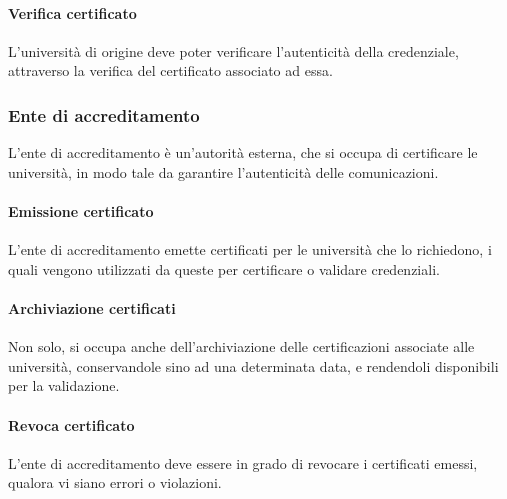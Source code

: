 \documentclass[a4paper,12pt]{article}
\begin{document}
\paragraph{Verifica certificato} L'università di origine deve poter verificare l'autenticità della credenziale, attraverso la verifica del certificato associato ad essa.

\subsubsection{Ente di accreditamento}
L'ente di accreditamento è un'autorità esterna, che si occupa di certificare le università, in modo tale da garantire l'autenticità delle comunicazioni. 
\paragraph{Emissione certificato} L'ente di accreditamento emette certificati per le università che lo richiedono, i quali vengono utilizzati da queste per certificare o validare credenziali.
\paragraph{Archiviazione certificati} Non solo, si occupa anche dell'archiviazione delle certificazioni associate alle università, conservandole sino ad una determinata data, e rendendoli disponibili per la validazione.
\paragraph{Revoca certificato} L'ente di accreditamento deve essere in grado di revocare i certificati emessi, qualora vi siano errori o violazioni.
\end{document}
